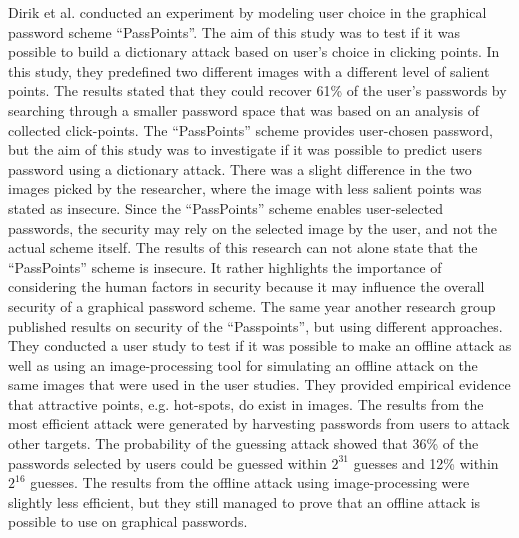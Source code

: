     Dirik et al. \cite{Dirik} conducted an experiment by modeling user choice in the graphical password scheme ``PassPoints''. The aim of this study was to test if it was possible to build a dictionary attack based on user's choice in clicking points. In this study, they predefined two different images with a different level of salient points. The results stated that they could recover 61\% of the user's passwords by searching through a smaller password space that was based on an analysis of collected click-points. The ``PassPoints'' scheme provides user-chosen password, but the aim of this study was to investigate if it was possible to predict users password using a dictionary attack. There was a slight difference in the two images picked by the researcher, where the image with less salient points was stated as insecure. Since the ``PassPoints'' scheme enables user-selected passwords, the security may rely on the selected image by the user, and not the actual scheme itself. The results of this research can not alone state that the ``PassPoints'' scheme is insecure. It rather highlights the importance of considering the human factors in security because it may influence the overall security of a graphical password scheme. The same year another research group published \cite{Thorpe2} results on security of the ``Passpoints'', but using different approaches. They conducted a user study to test if it was possible to make an offline attack as well as using an image-processing tool for simulating an offline attack on the same images that were used in the user studies. They provided empirical evidence that attractive points, e.g. hot-spots, do exist in images. The results from the most efficient attack were generated by harvesting passwords from users to attack other targets. The probability of the guessing attack showed that 36\% of the passwords selected by users could be guessed within $2^{31}$ guesses and 12\% within $2^{16}$ guesses. The results from the offline attack using image-processing were slightly less efficient, but they still managed to prove that an offline attack is possible to use on graphical passwords.

